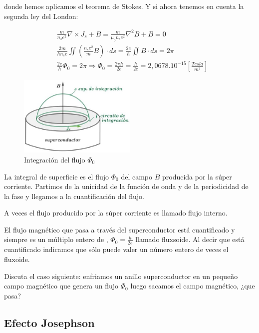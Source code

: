 donde hemos aplicamos el teorema de Stokes. Y si ahora tenemos en cuenta la segunda ley del London:

\begin{equation}
\begin{aligned}
\label{eq:flujoCuantizado}
	& \frac{m}{n_{s} e^{2}} \nabla \times J_{s} + B =  \frac{m}{\mu_{0} n_{s} e^{2}} \nabla^{2} B+B=0 \\
	& \frac{2m}{\hbar n_{s} e} \iint \left(\frac{n_{s}e^{2}}{m}B \right) \cdot ds = \frac{2e}{\hbar} \iint B \cdot ds = 2\pi \\
	& \frac{2e}{\hbar} \Phi_{0} = 2\pi \Rightarrow \Phi_{0} = \frac{2\pi\hbar}{2e} = \frac{h}{2e} = 2,0678.10^{-15} \left[ \frac{Tesla}{m^{2}} \right] 
\end{aligned}
\end{equation}


\begin{figure}[H]
    \centering
    \includegraphics[width=0.5\textwidth]{./Figures/fig436}
	\caption{Integración del flujo $\Phi_{0}$}
	\label{fig:436}
\end{figure}

La integral de superficie es el flujo $\Phi_{0}$ del campo $B$ producida por la súper corriente. Partimos de la unicidad de la función de onda y de la periodicidad de la fase y llegamos a la cuantificación del flujo.

A veces el flujo producido por la súper corriente es llamado flujo interno.

El flujo magnético que pasa a través del superconductor está cuantificado y siempre es un múltiplo entero de , $\Phi_{0}=\frac{h}{2e}$ llamado fluxsoide. Al decir que está cuantificado indicamos que sólo puede valer un número entero de veces el fluxoide.

Discuta el caso siguiente: enfriamos un anillo superconductor en un pequeño campo magnético que genera un flujo $\Phi_{0}$ luego sacamos el campo magnético, ¿que pasa?


\subsection{Efecto Josephson}


